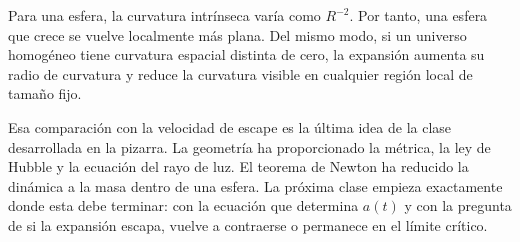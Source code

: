 Para una esfera, la curvatura intrínseca varía como \(R^{-2}\). Por tanto, una esfera que crece se vuelve localmente más plana. Del mismo modo, si un universo homogéneo tiene curvatura espacial distinta de cero, la expansión aumenta su radio de curvatura y reduce la curvatura visible en cualquier región local de tamaño fijo.

\begin{classroomqa}
\end{classroomqa}

Esa comparación con la velocidad de escape es la última idea de la clase desarrollada en la pizarra. La geometría ha proporcionado la métrica, la ley de Hubble y la ecuación del rayo de luz. El teorema de Newton ha reducido la dinámica a la masa dentro de una esfera. La próxima clase empieza exactamente donde esta debe terminar: con la ecuación que determina \(a(t)\) y con la pregunta de si la expansión escapa, vuelve a contraerse o permanece en el límite crítico.
